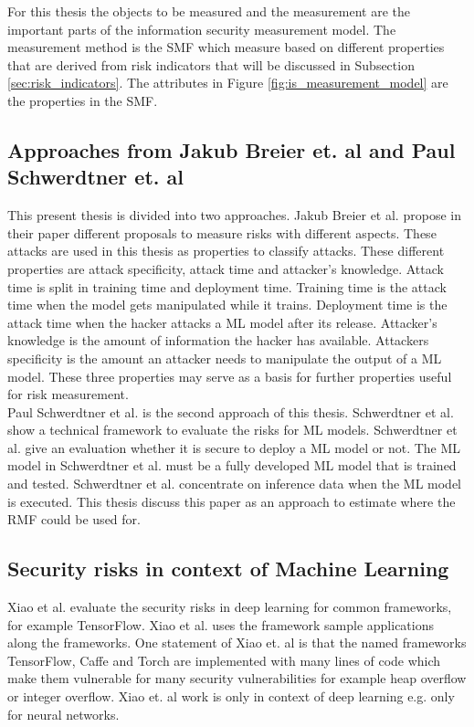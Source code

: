 For this thesis the objects to be measured and the measurement are the important parts of the information security measurement model. The measurement method is the SMF which measure based on different properties that are derived from risk indicators that will be discussed in Subsection \ref{sec:risk_indicators}. The attributes in Figure \ref{fig:is_measurement_model} are the properties in the SMF.

\subsection{Approaches from Jakub Breier et. al and Paul Schwerdtner et. al}

This present thesis is divided into two approaches. Jakub Breier et al. \cite{DBLP:journals/corr/abs-2012-04884} propose in their paper different proposals to measure risks with different aspects.
These attacks are used in this thesis as properties to classify attacks. These different properties are attack specificity, attack time and attacker's knowledge. Attack time is split in training time
and deployment time. Training time is the attack time when the model gets manipulated while it trains. Deployment time is the attack time when the hacker attacks a ML model after its release.
Attacker's knowledge is the amount of information the hacker has available. Attackers specificity is the amount an attacker needs to manipulate the output of a ML model. These three properties may
serve as a basis for further properties useful for risk measurement. \\
Paul Schwerdtner et al. \cite{DBLP:journals/corr/abs-2011-04328} is the second approach of this thesis. Schwerdtner et al. show a technical framework to evaluate the risks for ML models. Schwerdtner et
al. give an evaluation whether it is secure to deploy a ML model or not. The ML model in Schwerdtner et al. must be a fully developed ML model that is trained and tested. Schwerdtner et al. concentrate
on inference data when the ML model is executed. This thesis discuss this paper as an approach to estimate where the RMF could be used for.

\subsection{Security risks in context of Machine Learning}

Xiao et al. \cite{DBLP:conf/sp/XiaoLZX18} evaluate the security risks in deep learning for common frameworks, for example TensorFlow. Xiao et al. uses the framework sample applications along the
frameworks. One statement of Xiao et. al is that the named frameworks TensorFlow, Caffe and Torch are implemented with many lines of code which make them vulnerable for many security vulnerabilities
for example heap overflow or integer overflow. Xiao et. al work is only in context of deep learning e.g. only for neural networks.

